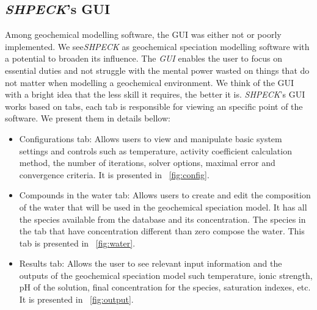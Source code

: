 \subsection{\emph{SHPECK}'s GUI }
Among geochemical modelling software, the GUI was either not or poorly implemented. We see\emph{SHPECK} as geochemical speciation modelling software with a potential to broaden its influence. The \emph{GUI} enables the user to focus on essential duties and not struggle with the mental power wasted on things that do not matter when modelling a geochemical environment. We think of the GUI with a bright idea that the less skill it requires, the better it is.
\emph{SHPECK}'s GUI works based on tabs, each tab is responsible for viewing an specific point of the software. We present them in details bellow:
\begin{itemize}
\item Configurations tab: Allows users to view and manipulate basic system settings and controls such as temperature, activity coefficient calculation method, the number of iterations, solver options, maximal error and convergence criteria. It is presented in ~\ref{fig:config}.
\item Compounds in the water tab: Allows users to create and edit the composition of the water that will be used in the geochemical speciation model. It has  all the species available from the database and its concentration. The species in the tab that have concentration different than zero compose the water. This tab is presented in ~\ref{fig:water}.
\item Results tab: Allows the user to see relevant input information and the outputs of the geochemical speciation model such temperature, ionic strength, pH of the solution, final concentration for the species, saturation indexes, etc. It is presented in ~\ref{fig:output}.
\end{itemize}


